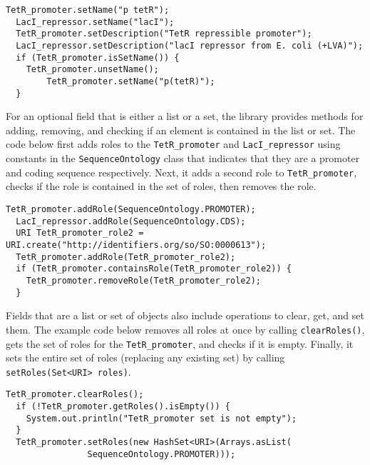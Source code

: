 \begin{minipage}{0.95\textwidth} 
\begin{lstlisting}[basicstyle=\footnotesize\ttfamily]
  TetR_promoter.setName("p tetR");
  LacI_repressor.setName("lacI");
  TetR_promoter.setDescription("TetR repressible promoter");
  LacI_repressor.setDescription("lacI repressor from E. coli (+LVA)");
  if (TetR_promoter.isSetName()) {
	TetR_promoter.unsetName();
        TetR_promoter.setName("p(tetR)");
  }
\end{lstlisting}
\end{minipage}

For an optional field that is either a list or a set, the library provides methods for adding, removing, and checking if an element is contained in the list or set.  The code below first adds roles to the \lstinline+TetR_promoter+ and \lstinline+LacI_repressor+ using constants in the
\lstinline+SequenceOntology+ class that indicates that they are a promoter and coding sequence respectively.  Next, it adds a second role to \lstinline+TetR_promoter+, checks if the role is contained in the set of roles, then removes the role.

\begin{minipage}{0.95\textwidth} 
\begin{lstlisting}[basicstyle=\footnotesize\ttfamily]
  TetR_promoter.addRole(SequenceOntology.PROMOTER);		
  LacI_repressor.addRole(SequenceOntology.CDS);
  URI TetR_promoter_role2 = URI.create("http://identifiers.org/so/SO:0000613"); 
  TetR_promoter.addRole(TetR_promoter_role2);
  if (TetR_promoter.containsRole(TetR_promoter_role2)) {
	TetR_promoter.removeRole(TetR_promoter_role2);
  }
\end{lstlisting}
\end{minipage}

Fields that are a list or set of objects also include operations to clear, get, and set them.  The example code below removes all roles at once by calling \lstinline+clearRoles()+, gets the set of roles for the \lstinline+TetR_promoter+, and checks if it is empty.   Finally, it sets the entire set of roles (replacing any existing set) by calling \lstinline+setRoles(Set<URI> roles)+.

\begin{minipage}{0.95\textwidth} 
\begin{lstlisting}[basicstyle=\footnotesize\ttfamily]
  TetR_promoter.clearRoles();
  if (!TetR_promoter.getRoles().isEmpty()) {
	System.out.println("TetR_promoter set is not empty");
  }
  TetR_promoter.setRoles(new HashSet<URI>(Arrays.asList(
 				SequenceOntology.PROMOTER)));
\end{lstlisting}
\end{minipage}


